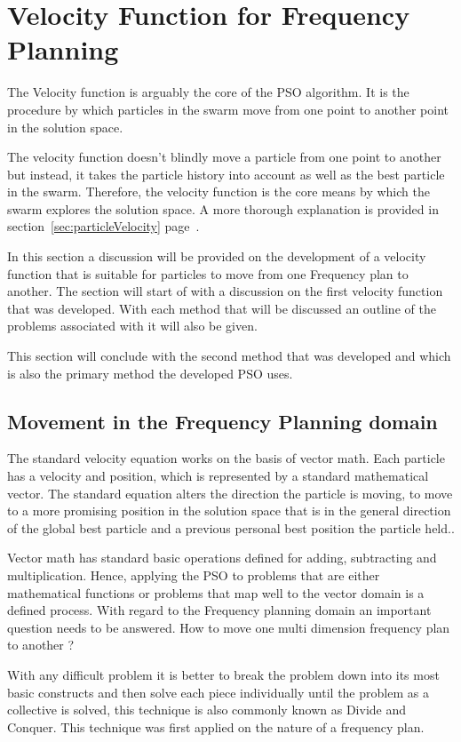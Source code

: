 \section{Velocity Function for Frequency Planning}
\label{sec:velocityFAP}
The Velocity function is arguably the core of the PSO algorithm. It is the procedure by which particles in the swarm move from one point to another point in the solution space. 

The velocity function doesn't blindly move a particle from one point to another but instead, it takes the particle history into account as well as the best particle in the swarm. Therefore, the velocity function is the core means by which
the swarm explores the solution space. A more thorough explanation is provided in section~\ref{sec:particleVelocity} page~\pageref{sec:particleVelocity}.

In this section a discussion will be provided on the development of a velocity function that is suitable for particles to move from one Frequency plan to another. The section will start of with a discussion on the first velocity function that was developed. With each method that will be discussed an outline of the problems associated with it will also be given. 

This section will conclude with the second method that was developed and which is also the primary method the developed PSO uses.

\subsection{Movement in the Frequency Planning domain}
The standard velocity equation works on the basis of vector math. Each particle has a velocity and position, which is represented by a standard mathematical vector. The standard equation alters the direction the particle is moving, to move to a more promising position in the solution space that is in the general direction of the global best particle and a previous personal best position the particle held..

Vector math has standard basic operations defined for adding, subtracting and multiplication. Hence, applying the PSO to problems that are either mathematical functions or problems that map well to the vector domain is a defined process. With regard to the Frequency planning domain an important question needs to be answered. How to move one multi dimension frequency plan to another ?

With any difficult problem it is better to break the problem down into its most basic constructs and then solve each piece individually until the problem as a collective is solved, this technique is also commonly known as Divide and Conquer. This technique was first applied on the nature of a frequency plan.

